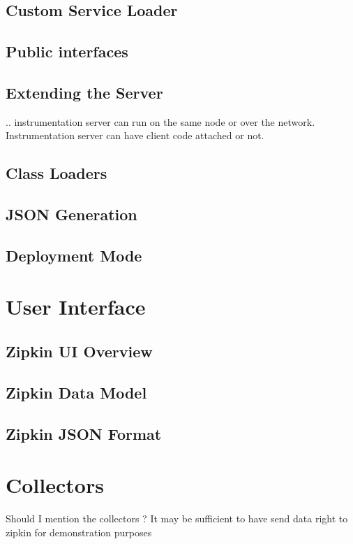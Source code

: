 \subsection{Custom Service Loader}
\subsection{Public interfaces}
\subsection{Extending the Server}
.. instrumentation server can run on the same node or over the network. Instrumentation server can have client code attached or not.
\subsection{Class Loaders}
\subsection{JSON Generation}
\subsection{Deployment Mode}
\label{sec:deploy_mode}
\section{User Interface}
\label{sec:zipkin_ui}
\subsection{Zipkin UI Overview}
\subsection{Zipkin Data Model}
\subsection{Zipkin JSON Format}
\section{Collectors}
Should I mention the collectors ? It may be sufficient to have send data right to zipkin for demonstration purposes

